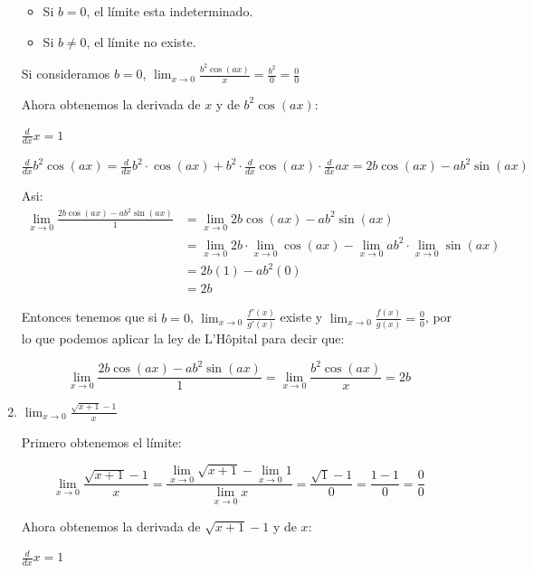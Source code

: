 \documentclass[12pt]{article}
\begin{document}
\begin{enumerate}[\hspace{9px} a)]
        \begin{itemize}
            \item Si $b=0$, el l\'imite esta indeterminado.
            \item Si $b \neq 0$, el l\'imite no existe. 
        \end{itemize}

        Si consideramos $b=0$, \(\displaystyle\lim_{x \to 0}\frac{b^2\cos(ax)}{x}=\frac{b^2}{0}=\frac{0}{0}\)\medskip

        Ahora obtenemos la derivada de $x$ y de $b^2\cos(ax)$:

        \(\displaystyle\frac{d}{dx}x = 1\)

        \(\displaystyle\frac{d}{dx}b^2\cos(ax) = \frac{d}{dx}b^2 \cdot \cos(ax) + b^2 \cdot \frac{d}{dx}\cos(ax) \cdot \frac{d}{dx}ax= 2b\cos(ax)-ab^2\sin(ax)\)\medskip

        Asi:
        \begin{align*}
            \displaystyle\lim_{x \to 0}\frac{2b\cos(ax)-ab^2\sin(ax)}{1}&=\lim_{x \to 0}2b\cos(ax)-ab^2\sin(ax)\\
            &= \lim_{x \to 0}2b \cdot \lim_{x \to 0}\cos(ax)- \lim_{x \to 0}ab^2 \cdot \lim_{x \to 0}\sin(ax)\\
            &= 2b(1)-ab^2(0)\\
            &= 2b
        \end{align*}

        Entonces tenemos que si $b=0$, \(\displaystyle\lim_{x \to 0}\frac{f'(x)}{g'(x)}\) existe y \(\displaystyle\lim_{x \to 0}\frac{f(x)}{g(x)}=\frac{0}{0}\), por lo que podemos aplicar la ley de L'H\^opital para decir que:

        \[\displaystyle\lim_{x \to 0}\frac{2b\cos(ax)-ab^2\sin(ax)}{1}=\lim_{x \to 0}\frac{b^2\cos(ax)}{x}=2b\]\medskip

    \item \(\displaystyle\lim_{x \to 0}\frac{\sqrt{x+1}-1}{x}\)\medskip
    
        Primero obtenemos el l\'imite:

        \[\displaystyle\lim_{x \to 0}\frac{\sqrt{x+1}-1}{x} = \frac{\displaystyle\lim_{x \to 0}\sqrt{x+1}-\displaystyle\lim_{x \to 0}1}{\displaystyle\lim_{x \to 0}x}=\frac{\sqrt{1}-1}{0}=\frac{1-1}{0}=\frac{0}{0}\]

        Ahora obtenemos la derivada de $\sqrt{x+1}-1$ y de $x$:

        \(\displaystyle\frac{d}{dx}x=1\)


\end{enumerate}
\end{document}
